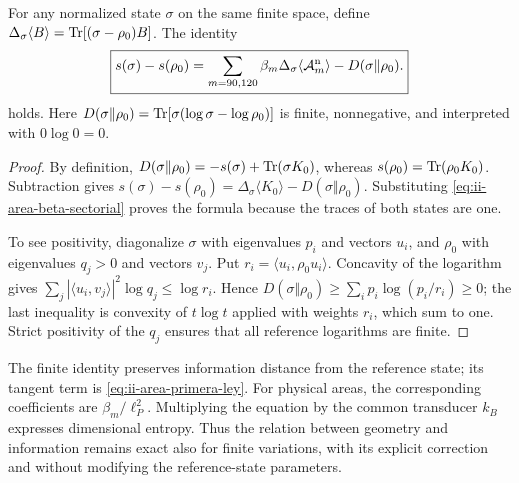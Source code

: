 \begin{theorem}
\label{thm:ii-area-ley-finita}
For any normalized state \(\sigma\) on the same finite space,
define \(\Delta_\sigma\langle B\rangle
=\operatorname{Tr}[(\sigma-\rho_0)B]\). The identity
\begin{equation}
 \boxed{
 s(\sigma)-s(\rho_0)
 =\sum_{m=90,120}\beta_m
      \Delta_\sigma\langle\mathcal A_m^{\rm n}\rangle
   -D(\sigma\Vert\rho_0).}
 \label{eq:ii-area-ley-finita}
\end{equation}
holds.
Here \(D(\sigma\Vert\rho_0)=\operatorname{Tr}[\sigma(\log\sigma-\log\rho_0)]\)
is finite, nonnegative, and interpreted with \(0\log0=0\).
\end{theorem}
\begin{proof}
By definition,
\(D(\sigma\Vert\rho_0)=-s(\sigma)+\operatorname{Tr}(\sigma K_0)\), whereas
\(s(\rho_0)=\operatorname{Tr}(\rho_0K_0)\). Subtraction gives
\(s(\sigma)-s(\rho_0)=\Delta_\sigma\langle K_0\rangle
-D(\sigma\Vert\rho_0)\). Substituting
\eqref{eq:ii-area-beta-sectorial} proves the formula because the
traces of both states are one.

To see positivity, diagonalize \(\sigma\) with eigenvalues
\(p_i\) and vectors \(u_i\), and \(\rho_0\) with eigenvalues
\(q_j>0\) and vectors \(v_j\). Put
\(r_i=\langle u_i,\rho_0u_i\rangle\). Concavity of the logarithm
gives
\(\sum_j|\langle u_i,v_j\rangle|^2\log q_j\le\log r_i\).
Hence
\(D(\sigma\Vert\rho_0)\ge\sum_i p_i\log(p_i/r_i)\ge0\);
the last inequality is convexity of \(t\log t\) applied
with weights \(r_i\), which sum to one. Strict positivity of the
\(q_j\) ensures that all reference logarithms are finite.
\end{proof}

The finite identity preserves information distance from the
reference state; its tangent term is
\eqref{eq:ii-area-primera-ley}. For physical areas, the
corresponding coefficients are \(\beta_m/\ell_P^2\).
Multiplying the equation by the common transducer \(k_B\) expresses
dimensional entropy. Thus the relation between geometry and information
remains exact also for finite variations, with its explicit
correction and without modifying the reference-state parameters.
